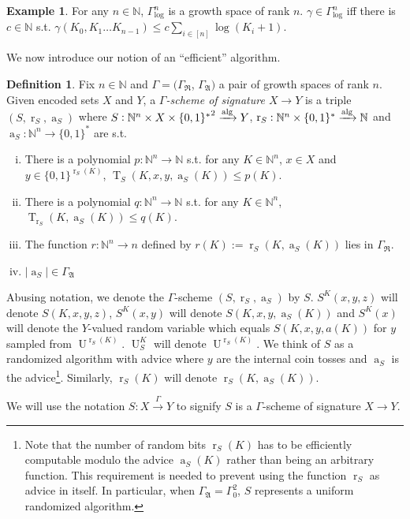 \documentclass{article}
\numberwithin{equation}{section}
\theoremstyle{definition}
\newtheorem{definition}{Definition}[section]
\newtheorem{example}{Example}[section]
\theoremstyle{plain}
\newcommand{\Bool}{\{0,1\}}
\newcommand{\Words}{{\Bool^*}}
\newcommand{\WordsLen}[1]{{\Bool^{#1}}}
\DeclareMathOperator{\T}{T}
\DeclareMathOperator{\R}{r}
\DeclareMathOperator{\A}{a}
\DeclareMathOperator{\Un}{U}
\newcommand{\Nats}{\mathbb{N}}
\newcommand{\Abs}[1]{\lvert #1 \rvert}
\newcommand{\GrowR}{\Gamma_{\mathfrak{R}}}
\newcommand{\GrowA}{\Gamma_{\mathfrak{A}}}
\newcommand{\Alg}{\xrightarrow{\textnormal{alg}}}
\newcommand{\Scheme}{\xrightarrow{\Gamma}}
\begin{document}
\begin{example}

For any $n \in \Nats$, $\Gamma_{\text{log}}^n$ is a growth space of rank $n$. $\gamma \in \Gamma_{\text{log}}^n$ iff there is $c \in \Nats$ s.t. $\gamma(K_0, K_1 \ldots K_{n-1}) \leq c \sum_{i \in [n]} \log(K_i+1)$.

\end{example}

We now introduce our notion of an \enquote{efficient} algorithm.

\begin{definition}

Fix $n \in \Nats$ and $\Gamma=(\GrowR$, $\GrowA)$ a pair of growth spaces of rank $n$. Given encoded sets $X$ and $Y$, a \emph{$\Gamma$-scheme of signature $X \rightarrow Y$} is a triple $(S,\R_S,\A_S)$ where $S: \Nats^n \times X \times \Words^2 \Alg Y$, $\R_S: \Nats^n \times \Words \Alg \Nats$ and $\A_S: \Nats^n \rightarrow \Words$ are s.t.

\begin{enumerate}[(i)]

\item There is a polynomial $p: \Nats^n \rightarrow \Nats$ s.t. for any $K \in \Nats^n$, $x \in X$ and $y \in \WordsLen{\R_S(K)}$, $\T_S(K,x,y,\A_S(K)) \leq p(K)$.

\item There is a polynomial $q: \Nats^n \rightarrow \Nats$ s.t. for any $K \in \Nats^n$, ${\T_{\R_S}(K,\A_S(K)) \leq q(K)}$.

\item The function $r: \Nats^n \rightarrow n$ defined by $r(K):=\R_S(K,\A_S(K))$ lies in $\GrowR$.

\item $\Abs{\A_S} \in \GrowA$

\end{enumerate}

Abusing notation, we denote the $\Gamma$-scheme $(S,\R_S,\A_S)$ by $S$. $S^K(x,y,z)$ will denote $S(K,x,y,z)$, $S^K(x,y)$ will denote $S(K,x,y,\A_S(K))$ and $S^K(x)$ will denote the $Y$-valued random variable which equals $S(K,x,y,a(K))$ for $y$ sampled from $\Un^{\R_S(K)}$. $\Un_S^K$ will denote $\Un^{\R_S(K)}$. We think of $S$ as a randomized algorithm with advice where $y$ are the internal coin tosses and $\A_S$ is the advice\footnote{Note that the number of random bits $\R_S(K)$ has to be efficiently computable modulo the advice $\A_S(K)$ rather than being an arbitrary function. This requirement is needed to prevent using the function $\R_S$ as advice in itself. In particular, when $\GrowA=\Gamma_0^2$, $S$ represents a uniform randomized algorithm.}. Similarly, $\R_S(K)$ will denote $\R_S(K,\A_S(K))$.

We will use the notation $S: X \Scheme Y$ to signify $S$ is a $\Gamma$-scheme of signature $X \rightarrow Y$.

\end{definition}
\end{document}
